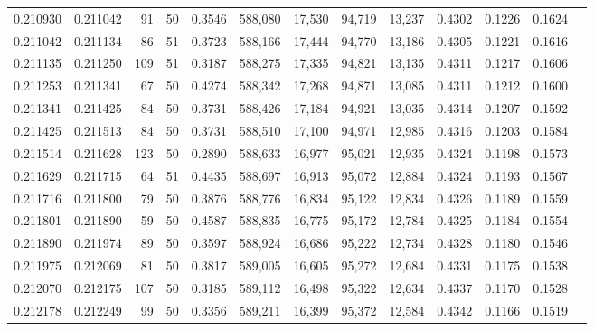 \begin{tabular}{rrrrrrrrrrrrr}
0.210930 & 0.211042 &    91 &  50 &                                     0.3546 & 588,080 &  17,530 &  94,719 &  13,237 & 0.4302 & 0.1226 & 0.1624 \\
0.211042 & 0.211134 &    86 &  51 &                                     0.3723 & 588,166 &  17,444 &  94,770 &  13,186 & 0.4305 & 0.1221 & 0.1616 \\
0.211135 & 0.211250 &   109 &  51 &                                     0.3187 & 588,275 &  17,335 &  94,821 &  13,135 & 0.4311 & 0.1217 & 0.1606 \\
0.211253 & 0.211341 &    67 &  50 &                                     0.4274 & 588,342 &  17,268 &  94,871 &  13,085 & 0.4311 & 0.1212 & 0.1600 \\
0.211341 & 0.211425 &    84 &  50 &                                     0.3731 & 588,426 &  17,184 &  94,921 &  13,035 & 0.4314 & 0.1207 & 0.1592 \\
0.211425 & 0.211513 &    84 &  50 &                                     0.3731 & 588,510 &  17,100 &  94,971 &  12,985 & 0.4316 & 0.1203 & 0.1584 \\
0.211514 & 0.211628 &   123 &  50 &                                     0.2890 & 588,633 &  16,977 &  95,021 &  12,935 & 0.4324 & 0.1198 & 0.1573 \\
0.211629 & 0.211715 &    64 &  51 &                                     0.4435 & 588,697 &  16,913 &  95,072 &  12,884 & 0.4324 & 0.1193 & 0.1567 \\
0.211716 & 0.211800 &    79 &  50 &                                     0.3876 & 588,776 &  16,834 &  95,122 &  12,834 & 0.4326 & 0.1189 & 0.1559 \\
0.211801 & 0.211890 &    59 &  50 &                                     0.4587 & 588,835 &  16,775 &  95,172 &  12,784 & 0.4325 & 0.1184 & 0.1554 \\
0.211890 & 0.211974 &    89 &  50 &                                     0.3597 & 588,924 &  16,686 &  95,222 &  12,734 & 0.4328 & 0.1180 & 0.1546 \\
0.211975 & 0.212069 &    81 &  50 &                                     0.3817 & 589,005 &  16,605 &  95,272 &  12,684 & 0.4331 & 0.1175 & 0.1538 \\
0.212070 & 0.212175 &   107 &  50 &                                     0.3185 & 589,112 &  16,498 &  95,322 &  12,634 & 0.4337 & 0.1170 & 0.1528 \\
0.212178 & 0.212249 &    99 &  50 &                                     0.3356 & 589,211 &  16,399 &  95,372 &  12,584 & 0.4342 & 0.1166 & 0.1519 \\

\end{tabular}
